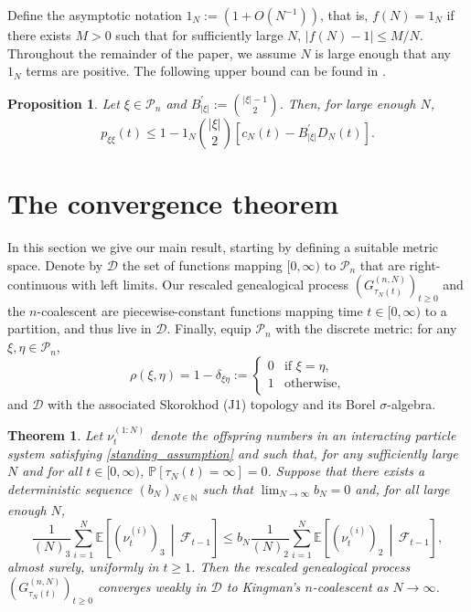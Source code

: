 \documentclass[12pt,authoryear]{article}
\newtheorem{theorem}{Theorem}
\newtheorem{prop}{Proposition}
\theoremstyle{definition}
\newcommand{\Prob}{\mathbb{P}}
\newcommand{\E}{\mathbb{E}}
\newcommand{\midd}{\,\middle|\,} %
\newcommand{\1}[1]{\mathbbm{1}_{#1}}
\newcommand{\ON}{1_N}
\begin{document}
Define the asymptotic notation $\ON := (1 + O(N^{-1}))$, that is,
$f(N) = \ON$ if there exists $M>0$ such that for sufficiently large $N$, $|f(N) -1| \leq M/N$.
Throughout the remainder of the paper, we assume $N$ is large enough that any $\ON$ terms are positive.
The following upper bound can be found in \citet[Supplement, Lemma 1 Case 1]{koskela2022erratum}.
\begin{prop}
\label{thm:pDelta_UB}
Let $\xi \in \mathcal{P}_n$ and $B_{|\xi|}^\prime := \binom{|\xi|-1}{2}$. Then, for large enough $N$,
\begin{equation*}
p_{\xi\xi}(t)
\leq 1 - \ON \binom{|\xi|}{2}
        \left[ c_N(t) - B_{|\xi|}^\prime D_N(t) \right].
\end{equation*}
\end{prop}

\section{The convergence theorem}

In this section we give our main result, starting by defining a suitable metric space.
Denote by $\mathcal{D}$ the set of functions mapping $[0,\infty)$ to $\mathcal{P}_n$ that are right-continuous with left limits.
Our rescaled genealogical process $(G^{(n,N)}_{\tau_N(t)})_{t\geq0}$ and the $n$-coalescent are piecewise-constant functions mapping time $t\in[0,\infty)$ to a partition, and thus live in $\mathcal{D}$.
Finally, equip $\mathcal{P}_n$ with the discrete metric: for any $\xi, \eta \in \mathcal{P}_n$,
\begin{equation*}
\rho(\xi,\eta) 
= 1- \delta_{\xi\eta} 
:= \begin{cases}
    0 &\text{if } \xi=\eta, \\
    1 &\text{otherwise},
\end{cases}
\end{equation*}
and $\mathcal{D}$ with the associated Skorokhod (J1) topology and its Borel $\sigma$-algebra.

\begin{theorem}\label{thm:weakconv}
Let $\nu_t^{(1:N)}$ denote the offspring numbers in an interacting particle system satisfying \textup{\ref{standing_assumption}} and such that, for any sufficiently large $N$ and for all $t \in [ 0, \infty )$, $\Prob[ \tau_N(t) = \infty ] =0$. Suppose that there exists a deterministic sequence $(b_N)_{N\in\mathbb{N}}$ such that ${\lim}_{N\to\infty} b_N =0$ and, for all large enough $N$,
\begin{equation}\label{eq:mainthmcondition2}
\frac{1}{(N)_3} \sum_{i = 1}^N \E\left[ (\nu_t^{(i)})_3 \midd \mathcal{F}_{t - 1} \right]  \leq b_N \frac{1}{(N)_2} \sum_{i = 1}^N \E\left[ (\nu_t^{(i)})_2 \midd \mathcal{F}_{t - 1} \right],
\end{equation}
almost surely, uniformly in $t \geq 1$.
Then the rescaled genealogical process $(G_{\tau_N(t)}^{(n,N)})_{t\geq0}$ converges weakly in $\mathcal{D}$ to Kingman's $n$-coalescent as $N \to \infty$.
\end{theorem}
\end{document}
